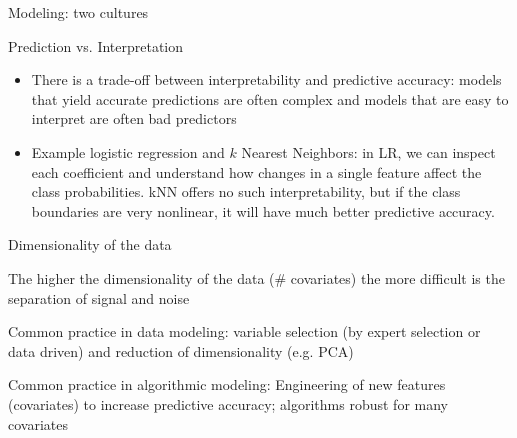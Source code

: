 \documentclass[11pt,compress,t,notes=noshow, xcolor=table]{beamer}
\begin{document}
\begin{vbframe}{Modeling: two cultures}
\end{vbframe}

\begin{vbframe}{Prediction vs. Interpretation}
\vspace{1.5cm}
\begin{center}
\end{center}

\framebreak

\begin{itemize}
  \item There is a trade-off between interpretability and predictive accuracy: models that yield accurate predictions are often complex and models that are easy to interpret are often bad predictors
  \lz
  \item Example logistic regression and $k$ Nearest Neighbors: in LR, we can inspect each coefficient and understand how changes in a single feature affect the class probabilities. kNN offers no such interpretability, but if the class boundaries are very nonlinear, it will have much better predictive accuracy.
\end{itemize}

\end{vbframe}

\begin{frame}{Dimensionality of the data}
\begin{blocki}{}
  \item The higher the dimensionality of the data (\# covariates) the more difficult is the separation of signal and noise
  \item Common practice in data modeling: variable selection (by expert selection or data driven) and reduction of dimensionality (e.g. PCA)
  \item Common practice in algorithmic modeling: Engineering of new features (covariates) to increase predictive accuracy; algorithms robust for many covariates
\end{blocki}

\end{frame}
\end{document}
